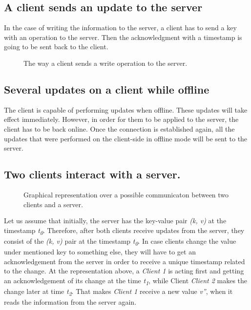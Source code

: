 \subsection{A client sends an update to the server}

In the case of writing the information to the server, a client has to send a key with an operation to the server. Then the acknowledgment with a timestamp is going to be sent back to the client.

\begin{figure}[!htb]
    \begin{center}
    \def\svgwidth{\linewidth}
    
    \caption {The way a client sends a write operation to the server.}
    \label{fig:design3}
\end{center}
\end{figure}

\subsection*{Several updates on a client while offline}

The client is capable of performing updates when offline. These updates will take effect immediately. However, in order for them to be applied to the server, the client has to be back online. Once the connection is established again, all the updates that were performed on the client-side in offline mode will be sent to the server.

\subsection{Two clients interact with a server.}

\begin{figure}[!htb]
    \begin{center}
    \def\svgwidth{\linewidth}
    
    \caption {Graphical representation over a possible communicaton between two clients and a server.}
    \label{fig:design4}
\end{center}
\end{figure}

Let us assume that initially, the server has the key-value pair \textit{(k, v)} at the timestamp \textit{t\textsubscript{0}}. Therefore, after both clients receive updates from the server, they consist of the \textit{(k, v)} pair at the timestamp \textit{t\textsubscript{0}}. In case clients change the value under mentioned key to something else, they will have to get an acknowledgement from the server in order to receive a unique timestamp related to the change. At the representation above, a \textit{Client 1} is acting first and getting an acknowledgement of its change at the time \textit{t\textsubscript{1}}, while Client \textit{Client 2} makes the change later at time \textit{t\textsubscript{2}}. That makes \textit{Client 1} receive a new value \textit{v''}, when it reads the information from the server again.

